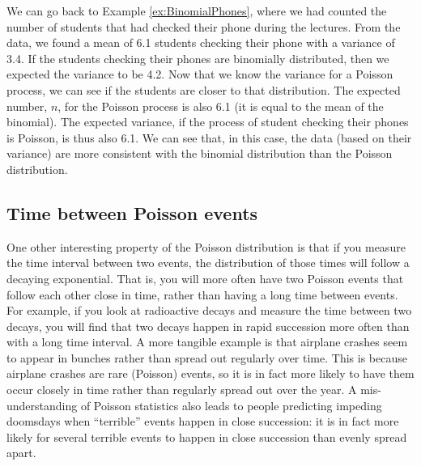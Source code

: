 We can go back to Example \ref{ex:BinomialPhones}, where we had counted the number of students that had checked their phone during the lectures. From the data, we found a mean of 6.1 students checking their phone with a variance of 3.4. If the students checking their phones are binomially distributed, then we expected the variance to be 4.2. Now that we know the variance for a Poisson process, we can see if the students are closer to that distribution. The expected number, $n$, for the Poisson process is also 6.1 (it is equal to the mean of the binomial). The expected variance, if the process of student checking their phones is Poisson, is thus also 6.1. We can see that, in this case, the data (based on their variance) are more consistent with the binomial distribution than the Poisson distribution.

\subsection{Time between Poisson events}
One other interesting property of the Poisson distribution is that if you measure the time interval between two events, the distribution of those times will follow a decaying exponential. That is, you will more often have two Poisson events that follow each other close in time, rather than having a long time between events. For example, if you look at radioactive decays and measure the time between two decays, you will find that two decays happen in rapid succession more often than with a long time interval. A more tangible example is that airplane crashes seem to appear in bunches rather than spread out regularly over time. This is because airplane crashes are rare (Poisson) events, so it is in fact more likely to have them occur closely in time rather than regularly spread out over the year. A mis-understanding of Poisson statistics also leads to people predicting impeding doomsdays when ``terrible'' events happen in close succession: it is in fact more likely for several terrible events to happen in close succession than evenly spread apart. 


